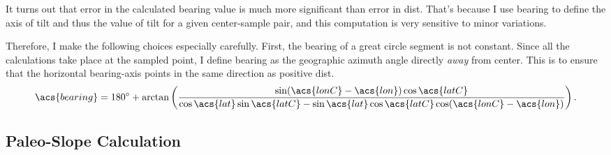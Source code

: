 It turns out that error in the calculated \acs{bearing} value is much more significant than error in \acs{dist}. That's because I use \acs{bearing} to define the axis of tilt and thus the value of tilt for a given center-sample pair, and this computation is very sensitive to minor variations.

Therefore, I make the following choices especially carefully. First, the bearing of a great circle segment is not constant. Since all the calculations take place at the sampled point, I define \acs{bearing} as the geographic azimuth angle directly \emph{away} from \acs{center}. This is to ensure that the horizontal \acs{bearing}-axis points in the same direction as positive \acs{dist}.
\begin{equation}
    \acs{bearing} = \ang{180} + \arctan\left(\frac{\sin(\acs{lonC}-\acs{lon})\cos\acs{latC}} {\cos\acs{lat} \sin\acs{latC}-\sin\acs{lat}\cos\acs{latC}\cos(\acs{lonC}-\acs{lon})}\right).
\end{equation} 

\subsection{Paleo-Slope Calculation}

